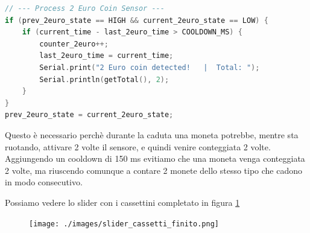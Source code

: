 \documentclass{article}
\begin{document}
\begin{lstlisting}[language=C++]
// --- Process 2 Euro Coin Sensor ---
if (prev_2euro_state == HIGH && current_2euro_state == LOW) {
    if (current_time - last_2euro_time > COOLDOWN_MS) {
        counter_2euro++;
        last_2euro_time = current_time;
        Serial.print("2 Euro coin detected!   |  Total: ");
        Serial.println(getTotal(), 2);
    }
}
prev_2euro_state = current_2euro_state;
\end{lstlisting}
Questo è necessario perchè durante la caduta una moneta potrebbe, mentre sta ruotando, attivare 2 volte il sensore, e quindi venire conteggiata 2 volte.
Aggiungendo un cooldown di 150 ms evitiamo che una moneta venga conteggiata 2 volte, ma riuscendo comunque a contare 2 monete dello stesso tipo che cadono in modo consecutivo.

\vspace{1em}

Possiamo vedere lo slider con i cassettini completato in figura \ref{fig:slider_cassetti_finito}
\begin{figure}[htbp]
  \centering
  \texttt{[image: ./images/slider\_cassetti\_finito.png]}
  \caption{}
  \label{fig:slider_cassetti_finito}
\end{figure}
\end{document}
